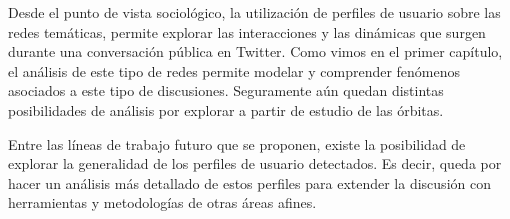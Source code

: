 Desde el punto de vista sociológico, la utilización de perfiles de usuario sobre las redes temáticas, permite explorar las interacciones y las dinámicas que surgen durante una conversación pública en Twitter. Como vimos en el primer capítulo, el análisis de este tipo de redes permite modelar y comprender fenómenos asociados a este tipo de discusiones. Seguramente aún quedan distintas posibilidades de análisis por explorar a partir de estudio de las órbitas.

Entre las líneas de trabajo futuro que se proponen, existe la posibilidad de explorar la generalidad de los perfiles de usuario detectados. Es decir, queda por hacer un análisis más detallado de estos perfiles para extender la discusión con herramientas y metodologías de otras áreas afines.

